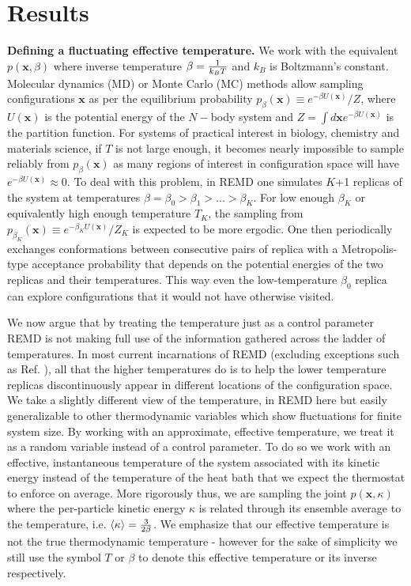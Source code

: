 \documentclass[9pt,twocolumn,twoside]{pnas-new}
\begin{document}
\section*{Results}

\textbf{Defining a fluctuating effective temperature.} We work with the equivalent $p(\mathbf{x},\beta)$ where inverse temperature $\beta = {1 \over k_B T}$ and $k_B$ is Boltzmann's constant. Molecular dynamics (MD) or Monte Carlo (MC) methods allow sampling configurations $\mathbf{x}$ as per the equilibrium probability $p_{\beta}(\mathbf{x}) \equiv {e^{-\beta U(\mathbf{x})} /  Z}$, where $U(\mathbf{x})$ is the potential energy of the $N-$body system and $Z = \int d\mathbf{x} e^{-\beta U(\mathbf{x})}$ is the partition function. For systems of practical interest in biology, chemistry and materials science,  if $T$ is not large enough, it becomes nearly impossible to sample reliably from $p_{\beta}(\mathbf{x})$ as many regions of interest in configuration space will have $e^{-\beta U(\mathbf{x})} \approx 0$. To deal with this problem, in REMD one simulates $K$+1 replicas of the system at temperatures $\beta = \beta_0 > \beta_1 > ... > \beta_K $. For low enough $\beta_K $ or equivalently high enough temperature $T_K$, the sampling from $p_{\beta_K}(\mathbf{x}) \equiv {e^{-\beta_K U(\mathbf{x})} /  Z_K}$ is expected to be more ergodic. One then periodically exchanges conformations between consecutive pairs of replica with a Metropolis-type acceptance probability that depends on the potential energies of the two replicas and their temperatures. This way even the low-temperature $\beta_0$ replica can explore configurations that it would not have otherwise visited. 

We now argue that by treating the temperature just as a control parameter REMD is not making full use of the information gathered across the ladder of temperatures. In  most current incarnations of REMD (excluding exceptions such as Ref. \cite{gallicchio2005temperature}), all that the higher temperatures do is to help the lower temperature replicas discontinuously appear in different locations of the configuration space. We take a slightly different view of the temperature, in REMD here but easily generalizable to other thermodynamic variables which show fluctuations for finite system size. By working with an approximate, effective temperature, we treat it as a random variable instead of a control parameter. To do so we work with an effective, instantaneous temperature of the system associated with its kinetic energy instead of the temperature of the heat bath that we expect the thermostat to enforce on average. More rigorously thus, we are sampling the joint $p(\mathbf{x},\kappa)$ where the per-particle kinetic energy $\kappa$ is related through its ensemble average to the temperature, i.e. $\langle \kappa \rangle = {3 \over 2\beta} $. We emphasize that our effective temperature is not the true thermodynamic temperature - however for the sake of simplicity we still use the symbol $T$ or $\beta$ to denote this effective temperature or its inverse respectively.
\end{document}
